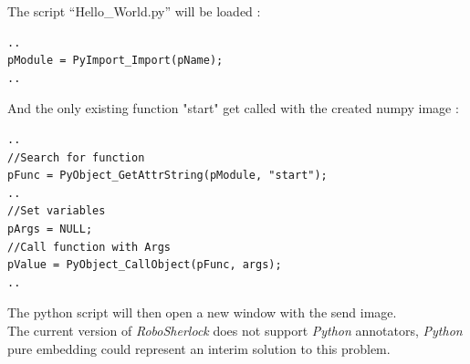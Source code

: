 \documentclass[main.tex]{subfiles}
\begin{document}
The script “Hello\_World.py” will be loaded :  

\begin{lstlisting}
..
pModule = PyImport_Import(pName);
..
\end{lstlisting}
And the only existing function "start" get called with the created numpy image : 
\begin{lstlisting}
..
//Search for function
pFunc = PyObject_GetAttrString(pModule, "start");
..
//Set variables
pArgs = NULL;
//Call function with Args
pValue = PyObject_CallObject(pFunc, args);
..
\end{lstlisting}
The python script will then open a new window with the send image.\\
The current version of \textit{RoboSherlock} does not support \textit{Python} annotators, \textit{Python} pure embedding could represent an interim solution to this problem.

\endgroup
\end{document}
